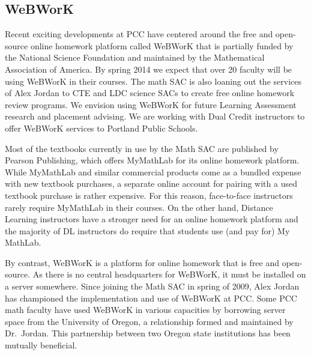 
\subsection{WeBWorK}\label{other:sec:webwork}
Recent exciting developments at PCC have centered around the free and open-source online homework platform called WeBWorK that is partially funded by the National Science Foundation and maintained by the Mathematical Association of America. By spring 2014 we expect that over 20 faculty will be using WeBWorK in their courses. The math SAC is also loaning out the services of Alex Jordan to CTE and LDC science SACs to create free online homework review programs. We envision using WeBWorK for future Learning Assessment research and placement advising. We are working with Dual Credit instructors to offer WeBWorK services to Portland Public Schools.

Most of the textbooks currently in use by the Math SAC are published by Pearson Publishing, which offers MyMathLab for its online homework platform. While MyMathLab and similar commercial products come as a bundled expense with new textbook purchases, a separate online account for pairing with a used textbook purchase is rather expensive. For this reason, face-to-face instructors rarely require MyMathLab in their courses. On the other hand, Distance Learning instructors have a stronger need for an online homework platform and the majority of DL instructors do require that students use (and pay for) My MathLab.

By contrast, WeBWorK is a platform for online homework that is free and open-source. As there is no central headquarters for WeBWorK, it must be installed on a server somewhere. Since joining the Math SAC in spring of 2009, Alex Jordan has championed the implementation and use of WeBWorK at PCC. Some PCC math faculty have used WeBWorK in various capacities by borrowing server space from the University of Oregon, a relationship formed and maintained by Dr.\ Jordan. This partnership between two Oregon state institutions has been mutually beneficial. %

